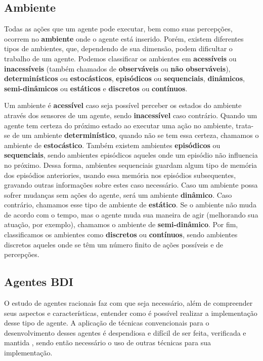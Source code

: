 \subsection{Ambiente}
Todas as ações que um agente pode executar, bem como suas percepções, ocorrem
no \textbf{ambiente} onde o agente está inserido. Porém, existem diferentes
tipos de ambientes, que, dependendo de sua dimensão, podem dificultar o trabalho
de um agente. Podemos classificar os ambientes em \textbf{acessíveis} ou
\textbf{inacessíveis} (também chamados de \textbf{observáveis} ou \textbf{não
observáveis}), \textbf{determinísticos} ou \textbf{estocásticos},
\textbf{episódicos} ou \textbf{sequenciais}, \textbf{dinâmicos},
\textbf{semi-dinâmicos} ou \textbf{estáticos} e \textbf{discretos} ou
\textbf{contínuos}.

Um ambiente é \textbf{acessível} caso seja possível perceber os estados do
ambiente através dos sensores de um agente, sendo \textbf{inacessível} caso
contrário. Quando um agente tem certeza do próximo estado ao executar uma ação
no ambiente, trata-se de um ambiente \textbf{determinístico}, quando não se tem
essa certeza, chamamos o ambiente de \textbf{estocástico}. Também existem
ambientes \textbf{episódicos} ou \textbf{sequenciais}, sendo ambientes
episódicos aqueles onde um episódio não influencia no próximo. Dessa forma,
ambientes sequenciais guardam algum tipo de memória dos episódios anteriories,
usando essa memória nos episódios subsequentes, gravando outras informações
sobre estes caso necessário. Caso um ambiente possa sofrer mudanças sem ações
do agente, será um ambiente \textbf{dinâmico}. Caso contrário, chamamos esse
tipo de ambiente de \textbf{estático}. Se o ambiente não muda de acordo com o
tempo, mas o agente muda sua maneira de agir (melhorando sua atuação, por
exemplo), chamamos o ambiente de \textbf{semi-dinâmico}. Por fim, classificamos
os ambientes como \textbf{discretos} ou \textbf{contínuos}, sendo ambientes
discretos aqueles onde se têm um número finito de ações possíveis e de
percepções.

\subsection{Agentes BDI}
O estudo de agentes racionais faz com que seja necessário, além de
compreender seus aspectos e características, entender como é possível
realizar a implementação desse tipo de agente. A aplicação de técnicas
convencionais para o desenvolvimento desses agentes é despendiosa e
difícil de ser feita, verificada e mantida \cite{bdi-icmas95}, sendo
então necessário o uso de outras técnicas para sua implementação.

